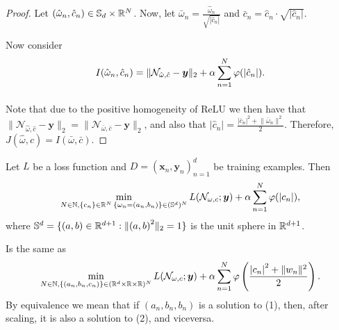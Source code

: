 \documentclass[twoside]{article}
\begin{document}
    \begin{proof}
        Let $(\hat{\omega}_n, \hat{c}_n) \in \mathbb{S}_{d} \times \mathbb{R}^{N}$.
        Now, let $\bar{\omega}_n = \frac{\hat{\omega}_n}{\sqrt{|\hat{c}_n |}}$ and
        $\bar{c}_n = \hat{c}_n \cdot \sqrt{|\hat{c}_n|}$.

        Now consider
        \begin{align*}
            I(\hat{\omega}_n, \hat{c}_n) &= \lVert \mathcal{N}_{\hat{\omega}, \hat{c}} - \bm{y} \rVert_{2}
                            + \alpha \sum_{n = 1}^{N} \varphi(|\hat{c}_n|).\\
                          \intertext{}
        \end{align*}
        Note that due to the positive homogeneity of ReLU we then have that 
        $\lVert \mathcal{N}_{\hat{\omega}, \hat{c}} - \bm{y} \rVert_{2} = \lVert \mathcal{N}_{\bar{\omega}, \bar{c}} - \bm{y} \rVert_{2} $,
        and also that $|\hat{c}_n | = \frac{|\bar{c}_n|^2 + \lVert \bar{\omega}_n \rVert^2}{2}$.
        Therefore, $J(\hat{\omega}, \hat{c}) = I(\bar{\omega}, \bar{c})$.
    \end{proof}

    \begin{theorem}
        Let $L$ be a loss function and $D = (\bm{x}_{n}, \bm{y}_{n})_{n=1}^{d}$ be training examples. Then
        \begin{equation}
            \min_{N \in \mathbb{N}, \{c_{n}\} \in \mathbb{R}^{N}\, \{\omega_{n} = (a_{n}, b_{n})\} \in (\mathbb{S}^{d})^{N}} 
            L(\mathcal{N}_{\omega, c} ; \bm{y}) + \alpha \sum_{n=1}^{N} \varphi(\abs{c_{n}}),
        \end{equation}
        where $\mathbb{S}^{d} = \{(a,b) \in \mathbb{R}^{d + 1} : \lVert {(a,b)}^{2} \rVert_{2} = 1\}$ is the unit sphere in $\mathbb{R}^{d + 1}$.

        Is the same as
        \begin{equation}
            \min_{N \in \mathbb{N}, \{(a_{n}, b_{n}, c_{n})\}\in (\mathbb{R}^{d} \times \mathbb{R} \times \mathbb{R})^{N}} L(\mathcal{N}_{\omega, c} ; \bm{y})
            + \alpha \sum_{n=1}^{N} \varphi\left(\frac{\abs{c_{n}}^{2} + \lVert w_{n} \rVert^{2}}{2}\right).
        \end{equation}
    By equivalence we mean that
    if $(a_{n}, b_{n}, b_{n})$ is a solution to (1), then, after scaling, 
    it is also a solution to (2), and viceversa.
    \end{theorem}
\end{document}
